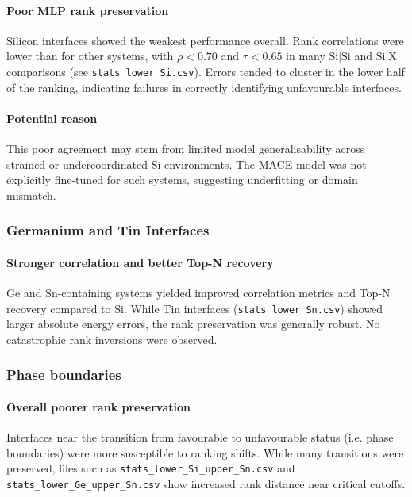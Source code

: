 \paragraph{Poor MLP rank preservation}

Silicon interfaces showed the weakest performance overall. Rank correlations were lower than for other systems, with $\rho < 0.70$ and $\tau < 0.65$ in many Si|Si and Si|X comparisons (see \texttt{stats\_lower\_Si.csv}). Errors tended to cluster in the lower half of the ranking, indicating failures in correctly identifying unfavourable interfaces.

\paragraph{Potential reason}

This poor agreement may stem from limited model generalisability across strained or undercoordinated Si environments. The MACE model was not explicitly fine-tuned for such systems, suggesting underfitting or domain mismatch.

\subsubsection{Germanium and Tin Interfaces}

\paragraph{Stronger correlation and better Top-N recovery}

Ge and Sn-containing systems yielded improved correlation metrics and Top-N recovery compared to Si. While Tin interfaces (\texttt{stats\_lower\_Sn.csv}) showed larger absolute energy errors, the rank preservation was generally robust. No catastrophic rank inversions were observed.

\subsubsection{Phase boundaries}

\paragraph{Overall poorer rank preservation}

Interfaces near the transition from favourable to unfavourable status (i.e. phase boundaries) were more susceptible to ranking shifts. While many transitions were preserved, files such as \texttt{stats\_lower\_Si\_upper\_Sn.csv} and \texttt{stats\_lower\_Ge\_upper\_Sn.csv} show increased rank distance near critical cutoffs.

